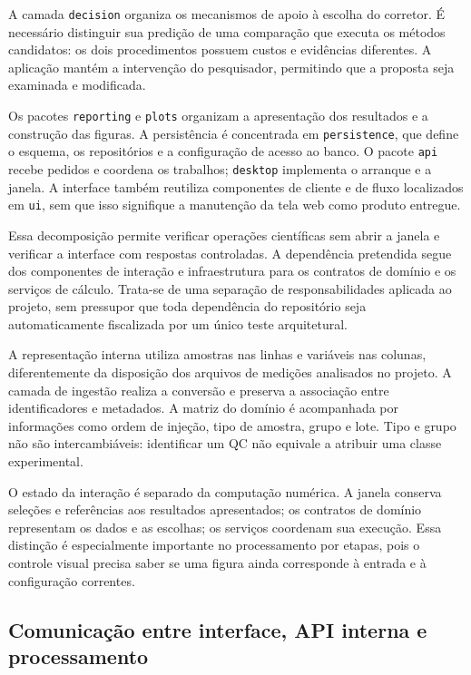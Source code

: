A camada \texttt{decision} organiza os mecanismos de apoio à escolha do corretor. É necessário distinguir sua predição de uma comparação que executa os métodos candidatos: os dois procedimentos possuem custos e evidências diferentes. A aplicação mantém a intervenção do pesquisador, permitindo que a proposta seja examinada e modificada.

Os pacotes \texttt{reporting} e \texttt{plots} organizam a apresentação dos resultados e a construção das figuras. A persistência é concentrada em \texttt{persistence}, que define o esquema, os repositórios e a configuração de acesso ao banco. O pacote \texttt{api} recebe pedidos e coordena os trabalhos; \texttt{desktop} implementa o arranque e a janela. A interface também reutiliza componentes de cliente e de fluxo localizados em \texttt{ui}, sem que isso signifique a manutenção da tela web como produto entregue.

Essa decomposição permite verificar operações científicas sem abrir a janela e verificar a interface com respostas controladas. A dependência pretendida segue dos componentes de interação e infraestrutura para os contratos de domínio e os serviços de cálculo. Trata-se de uma separação de responsabilidades aplicada ao projeto, sem pressupor que toda dependência do repositório seja automaticamente fiscalizada por um único teste arquitetural.

A representação interna utiliza amostras nas linhas e variáveis nas colunas, diferentemente da disposição dos arquivos de medições analisados no projeto. A camada de ingestão realiza a conversão e preserva a associação entre identificadores e metadados. A matriz do domínio é acompanhada por informações como ordem de injeção, tipo de amostra, grupo e lote. Tipo e grupo não são intercambiáveis: identificar um QC não equivale a atribuir uma classe experimental.

O estado da interação é separado da computação numérica. A janela conserva seleções e referências aos resultados apresentados; os contratos de domínio representam os dados e as escolhas; os serviços coordenam sua execução. Essa distinção é especialmente importante no processamento por etapas, pois o controle visual precisa saber se uma figura ainda corresponde à entrada e à configuração correntes.

\subsection{Comunicação entre interface, API interna e processamento}

